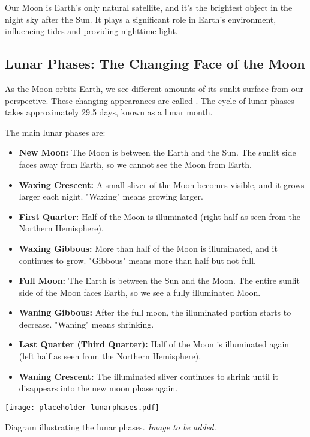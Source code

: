 \FloatBarrier
\1

Our Moon is Earth's only natural satellite, and it's the brightest object in the night sky after the Sun.  It plays a significant role in Earth's environment, influencing tides and providing nighttime light.

\subsection{Lunar Phases: The Changing Face of the Moon}

As the Moon orbits Earth, we see different amounts of its sunlit surface from our perspective. These changing appearances are called . The cycle of lunar phases takes approximately 29.5 days, known as a lunar month.

The main lunar phases are:

\begin{itemize}
    \item \textbf{New Moon:} The Moon is between the Earth and the Sun. The sunlit side faces away from Earth, so we cannot see the Moon from Earth.
    \item \textbf{Waxing Crescent:}  A small sliver of the Moon becomes visible, and it grows larger each night. "Waxing" means growing larger.
    \item \textbf{First Quarter:} Half of the Moon is illuminated (right half as seen from the Northern Hemisphere).
    \item \textbf{Waxing Gibbous:} More than half of the Moon is illuminated, and it continues to grow. "Gibbous" means more than half but not full.
    \item \textbf{Full Moon:} The Earth is between the Sun and the Moon. The entire sunlit side of the Moon faces Earth, so we see a fully illuminated Moon.
    \item \textbf{Waning Gibbous:} After the full moon, the illuminated portion starts to decrease. "Waning" means shrinking.
    \item \textbf{Last Quarter (Third Quarter):} Half of the Moon is illuminated again (left half as seen from the Northern Hemisphere).
    \item \textbf{Waning Crescent:} The illuminated sliver continues to shrink until it disappears into the new moon phase again.
\end{itemize}

\begin{marginfigure}
\texttt{[image: placeholder-lunarphases.pdf]}
\caption{\label{fig:lunarphases}Diagram illustrating the lunar phases. \textit{Image to be added.}}
\end{marginfigure}

